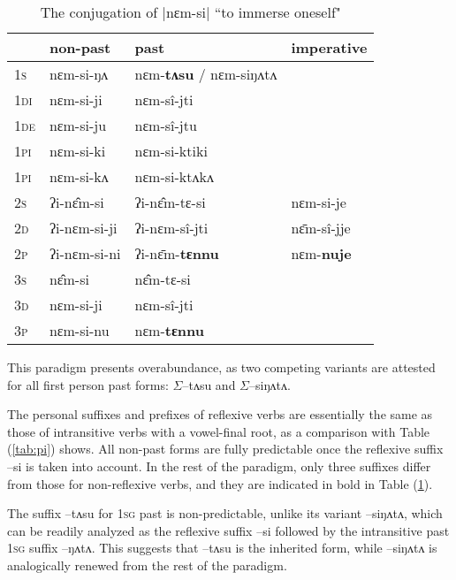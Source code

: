 \documentclass[twoside,a4paper,11pt]{article}
\newcommand{\ipa}[1]{{\phon#1}}
\newcommand{\grise}[1]{\cellcolor{lightgray}\textbf{#1}}
\newcommand{\ro}{$\Sigma$}
\begin{document}
\begin{table}[h]
\caption{The conjugation of |\ipa{nɛm-si}|  ``to immerse oneself"  } \centering \label{tab:nyamsi}
\begin{tabular}{l|l|l|l}  
\toprule
& non-past & past & imperative\\
\midrule
\textsc{1s}  &  \ipa{nɛm-si-ŋʌ}   &  \ipa{nɛm-\textbf{tʌsu}} / \ipa{nɛm-siŋʌtʌ}  \grise{}\\ 
\textsc{1di}  &  \ipa{nɛm-si-ji}   &  \ipa{nɛm-sî-jti} \\
\textsc{1de}  &  \ipa{nɛm-si-ju}   &  \ipa{nɛm-sî-jtu} \\ 
\textsc{1pi}  &  \ipa{nɛm-si-ki}   &  \ipa{nɛm-si-ktiki} \\ 
\textsc{1pi}  &  \ipa{nɛm-si-kʌ}   &  \ipa{nɛm-si-ktʌkʌ} \\ 
\midrule
\textsc{2s}  &  \ipa{ʔi-nɛ̂m-si}   &  \ipa{ʔi-nɛ̂m-tɛ-si}   &  \ipa{nɛm-si-je} \\ 
\textsc{2d}  &  \ipa{ʔi-nɛm-si-ji}   &  \ipa{ʔi-nɛm-sî-jti}   &  \ipa{nɛ̄m-sî-jje} \\
\textsc{2p}  &  \ipa{ʔi-nɛm-si-ni}   &  \ipa{ʔi-nɛ̄m-\textbf{tɛnnu}} \grise{}  &  \ipa{nɛm-\textbf{nuje}} \grise{}\\ 
\midrule
\textsc{3s}  &  \ipa{nɛ̂m-si}   &  \ipa{nɛ̂m-tɛ-si} \\ 
\textsc{3d}  &  \ipa{nɛm-si-ji}   &  \ipa{nɛm-sî-jti} \\ 
\textsc{3p}  &  \ipa{nɛm-si-nu}   &  \ipa{nɛm-\textbf{tɛnnu}} \grise{}\\ 
\bottomrule
\end{tabular}
\end{table}
This paradigm presents overabundance, as two competing variants are attested for all first person past forms: \ro{}\ipa{--tʌsu} and \ro{}\ipa{--siŋʌtʌ}.



 The personal suffixes and prefixes of reflexive verbs are essentially the same as those of  intransitive verbs with a vowel-final root, as a comparison with Table (\ref{tab:pi}) shows. All non-past forms are fully predictable once the reflexive suffix \ipa{--si} is taken into account. In the rest of the paradigm,  only three suffixes   differ  from those for non-reflexive verbs, and they are indicated in bold in Table (\ref{tab:nyamsi}).
 
   The   suffix \ipa{--tʌsu} for \textsc{1sg} past  is   non-predictable, unlike its variant \ipa{--siŋʌtʌ}, which can be readily analyzed as the reflexive suffix \ipa{--si} followed by the intransitive past \textsc{1sg} suffix \ipa{--ŋʌtʌ}. This   suggests that  \ipa{--tʌsu} is the inherited form, while  \ipa{--siŋʌtʌ} is analogically renewed from the rest of the paradigm.
 
\end{document}
